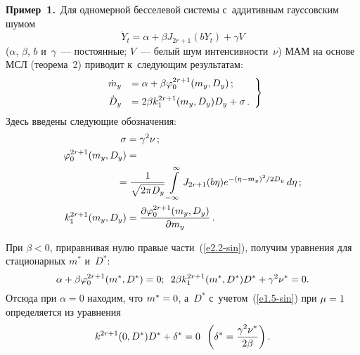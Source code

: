 \begin{multicols}{2}
{\noindent
\textbf{Пример~1.}\
Для одномерной бесселевой системы с~аддитивным гауссовским шумом
  \begin{equation*}
  \dot Y_t = \alpha +\beta J_{2r+1} (b Y_t) + \gamma V
  \end{equation*}
($\alpha$, $\beta$, $b$ и~$\gamma$~--- постоянные; $V$~--- белый шум интенсивности~$\nu$) 
МАМ на основе МСЛ (теорема~2) приводит к~следующим результатам:
   \begin{equation}
   \left.
   \begin{array}{rl}
   \dot m_y &= \alpha +\beta \varphi_0^{2r+1} (m_y, D_y)\,;\\[6pt] 
   \dot D_y &= 2\beta k_1^{2r+1}(m_y, D_y) D_y +\sigma\,.
   \end{array}
   \right\}
   \label{e2.2-sin}
   \end{equation}
Здесь введены следующие обозначения:
\begin{align*}
    \si&= \gamma^2 \nu\,;\\
    \vrp_0^{2r+1} (m_y, D_y) &={}\\
    &\hspace*{-10pt} {}=\fr{1}{\sqrt{2\pi D_y}} \iin J_{2r+1} (b\eta) 
    e^{-(\eta-m_y)^2/2D_y}\, d\eta\,;
  \\
k_1^{2r+1}(m_y, D_y) &=\fr{\prt \vrp_0^{2r+1}(m_y, D_y)}{\prt m_y}\,.
\end{align*}

При $\beta<0$, приравнивая нулю правые части~(\ref{e2.2-sin}), 
получим уравнения для стационарных $m^*$ и~$D^*$:
\begin{equation*}
\alpha+\beta \varphi_0^{2r+1}(m^*, D^*) =0;\enskip 
2\beta k_1^{2r+1}(m^*, D^*) D^* + \gamma^2 \nu^* =0.
\end{equation*}
Отсюда при $\alpha=0$ находим, что  $m^*\hm=0$, а~$D^*$ с~учетом~(\ref{e1.5-sin}) 
при $\mu\hm=1$ определяется из уравнения
\begin{equation*}
k^{2r+1}(0,D^*)D^* + \delta^* =0\enskip \left(\delta^* = \displaystyle\frac{\displaystyle \gamma^2 \nu^* \mathstrut}{\displaystyle 2\beta\mathstrut}\right).
\end{equation*}

}
\end{multicols}

